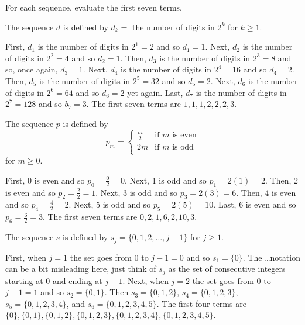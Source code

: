 \begin{exam}
\label{exam_eval_seq_words}
    For each sequence, evaluate the first seven terms.
        \begin{apart}
            \item The sequence $d$ is defined by $d_k =$ the number of digits in $2^k$ for $k \ge 1$.  
            \begin{soln}
                First, $d_1$ is the number of digits in $2^1=2$ and so $d_1=1$.  
                Next, $d_2$ is the number of digits in $2^2=4$ and so $d_2=1$.  
                Then, $d_3$ is the number of digits in $2^3=8$ and so, once again, $d_3=1$.  
                Next, $d_4$ is the number of digits in $2^4=16$ and so $d_4=2$.  
                Then, $d_5$ is the number of digits in $2^5=32$ and so $d_5=2$.  
                Next, $d_6$ is the number of digits in $2^6=64$ and so $d_6 = 2$ yet again.  
                Last, $d_7$ is the number of digits in $2^7=128$ and so $b_7=3$.  
                The first seven terms are $1,1,1,2,2,2,3$.
            \end{soln}

            \item The sequence $p$ is defined by $$p_m = \left\{ \begin{array} {cl} \frac{m}{2} & \text{if } m \text{ is even} \\ 2m & \text{if } m \text{ is odd} \\ \end{array} \right.$$ for $m \ge 0$. 
                \begin{soln}
                    First, 0 is even and so $p_0 = \frac{0}{2} = 0$.  
                    Next, 1 is odd and so $p_1=2(1) = 2$.  
                    Then, 2 is even and so $p_2=\frac{2}{2}=1$.  
                    Next, 3 is odd and so $p_3=2(3) = 6$.
                    Then, 4 is even and so $p_4=\frac{4}{2}=2$.
                    Next, 5 is odd and so $p_5=2(5) = 10$.
                    Last, 6 is even and so $p_6=\frac{6}{2}=3$.
                    The first seven terms are $0, 2, 1, 6, 2, 10, 3$.
                \end{soln}
            \item The sequence $s$ is defined by $s_j=\{0,1,2,\ldots,j-1\}$ for $j \ge 1$.  
                \begin{soln}
                    First, when $j=1$ the set goes from 0 to $j-1=0$ and so $s_1=\{0\}$.  The \ldots notation can be a bit misleading here, just think of $s_j$ as the set of consecutive integers starting at 0 and ending at $j-1$. Next, when $j=2$ the set goes from 0 to $j-1=1$ and so $s_2=\{0,1\}$.  Then $s_3=\{0,1,2\}$, $s_4=\{0,1,2,3\}$, $s_5=\{0,1,2,3,4\}$, and $s_6=\{0,1,2,3,4,5\}$.  The first four terms are $\{0\},\{0,1\},\{0,1,2\},\{0,1,2,3\}, \{0,1,2,3,4\}, \{0,1,2,3,4,5\}$.
                \end{soln}
    \end{apart}
\end{exam}

